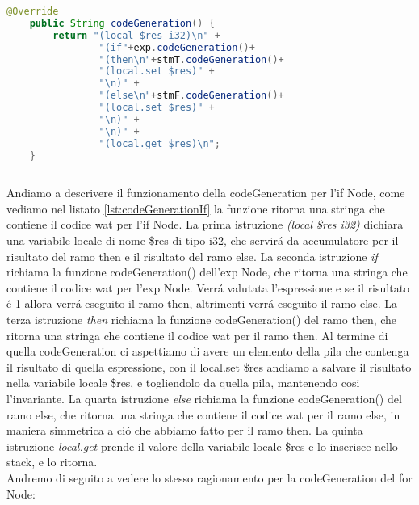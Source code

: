 \documentclass[../../main.tex]{subfiles}
\begin{document}
\begin{lstlisting}[language=Java, caption={codeGeneration() per l'if Node}, label={lst:codeGenerationIf}]
    @Override
    public String codeGeneration() {
        return "(local $res i32)\n" +
                "(if"+exp.codeGeneration()+
                "(then\n"+stmT.codeGeneration()+
                "(local.set $res)" +
                "\n)" +
                "(else\n"+stmF.codeGeneration()+
                "(local.set $res)" +
                "\n)" +
                "\n)" +
                "(local.get $res)\n";
    }
    
\end{lstlisting}
Andiamo a descrivere il funzionamento della codeGeneration per l'if Node, come vediamo nel listato \ref{lst:codeGenerationIf} la funzione ritorna una stringa che contiene il codice wat per l'if Node.
La prima istruzione \textit{(local \$res i32)} dichiara una variabile locale di nome \$res di tipo i32, che servirá da accumulatore per il risultato del ramo then e il risultato del ramo else.
La seconda istruzione \textit{if} richiama la funzione codeGeneration() dell'exp Node, che ritorna una stringa che contiene il codice wat per l'exp Node.
Verrá valutata l'espressione e se il risultato é 1 allora verrá eseguito il ramo then, altrimenti verrá eseguito il ramo else.
La terza istruzione \textit{then} richiama la funzione codeGeneration() del ramo then, che ritorna una stringa che contiene il codice wat per il ramo then.
Al termine di quella codeGeneration ci aspettiamo di avere un elemento della pila che contenga il risultato di quella espressione, con il local.set \$res andiamo a salvare il risultato nella variabile locale \$res, e togliendolo da quella pila, mantenendo cosi l'invariante.
La quarta istruzione \textit{else} richiama la funzione codeGeneration() del ramo else, che ritorna una stringa che contiene il codice wat per il ramo else, in maniera simmetrica a ció che abbiamo fatto per il ramo then.
La quinta istruzione \textit{local.get} prende il valore della variabile locale \$res e lo inserisce nello stack, e lo ritorna.\\

Andremo di seguito a vedere lo stesso ragionamento per la codeGeneration del for Node:
    
\end{document}
